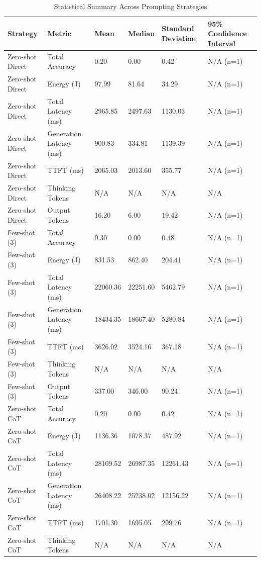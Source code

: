 \begin{table}
\caption{Statistical Summary Across Prompting Strategies}
\label{tab:statistical_summary}
\begin{tabular}{llllll}
\toprule
Strategy & Metric & Mean & Median & Standard Deviation & 95\% Confidence Interval \\
\midrule
Zero-shot Direct & Total Accuracy & 0.20 & 0.00 & 0.42 & N/A (n=1) \\
Zero-shot Direct & Energy (J) & 97.99 & 81.64 & 34.29 & N/A (n=1) \\
Zero-shot Direct & Total Latency (ms) & 2965.85 & 2497.63 & 1130.03 & N/A (n=1) \\
Zero-shot Direct & Generation Latency (ms) & 900.83 & 334.81 & 1139.39 & N/A (n=1) \\
Zero-shot Direct & TTFT (ms) & 2065.03 & 2013.60 & 355.77 & N/A (n=1) \\
Zero-shot Direct & Thinking Tokens & N/A & N/A & N/A & N/A \\
Zero-shot Direct & Output Tokens & 16.20 & 6.00 & 19.42 & N/A (n=1) \\
Few-shot (3) & Total Accuracy & 0.30 & 0.00 & 0.48 & N/A (n=1) \\
Few-shot (3) & Energy (J) & 831.53 & 862.40 & 204.41 & N/A (n=1) \\
Few-shot (3) & Total Latency (ms) & 22060.36 & 22251.60 & 5462.79 & N/A (n=1) \\
Few-shot (3) & Generation Latency (ms) & 18434.35 & 18667.40 & 5280.84 & N/A (n=1) \\
Few-shot (3) & TTFT (ms) & 3626.02 & 3524.16 & 367.18 & N/A (n=1) \\
Few-shot (3) & Thinking Tokens & N/A & N/A & N/A & N/A \\
Few-shot (3) & Output Tokens & 337.00 & 346.00 & 90.24 & N/A (n=1) \\
Zero-shot CoT & Total Accuracy & 0.20 & 0.00 & 0.42 & N/A (n=1) \\
Zero-shot CoT & Energy (J) & 1136.36 & 1078.37 & 487.92 & N/A (n=1) \\
Zero-shot CoT & Total Latency (ms) & 28109.52 & 26987.35 & 12261.43 & N/A (n=1) \\
Zero-shot CoT & Generation Latency (ms) & 26408.22 & 25238.02 & 12156.22 & N/A (n=1) \\
Zero-shot CoT & TTFT (ms) & 1701.30 & 1695.05 & 299.76 & N/A (n=1) \\
Zero-shot CoT & Thinking Tokens & N/A & N/A & N/A & N/A \\

\end{tabular}
\end{table}
